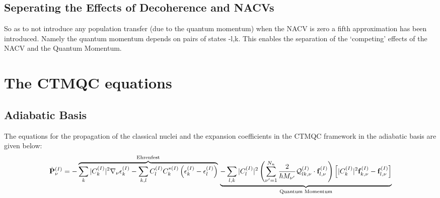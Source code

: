 \subsection{Seperating the Effects of Decoherence and NACVs}
So as to not introduce any population transfer (due to the quantum momentum) when the NACV is zero a fifth approximation has been introduced. Namely the quantum momentum depends on pairs of states -l,k. This enables the separation of the `competing' effects of the NACV and the Quantum Momentum.
\section{The CTMQC equations}
\subsection{Adiabatic Basis}
\label{sec:ad_eqns}
The equations for the propagation of the classical nuclei and the expansion coefficients in the CTMQC framework in the adiabatic basis are given below:
\begin{dmath}
  \dot{\mathbf{P}}_{\nu}^{(I)} =
  -\overbrace{
     \sum_{k} |C_{k}^{(I)}|^2 \nabla_{\nu}\epsilon_{k}^{(I)}
     - \sum_{k,l} C_{l}^{(I)} C_{k}^{* (I)} \left(\epsilon_{k}^{(I)}  - \epsilon_{l}^{(I)}   \right)
  }^{\text{Ehrenfest}}
  \\
  \underbrace{
    - \sum_{l,k} |C_{l}^{(I)}|^2 \left( \sum_{\nu'=1}^{N_n}    \frac{2}{\hbar M_{\nu'}} \mathcal{Q}_{lk, \nu}^{(I)} \cdot    \mathbf{f}_{l, \nu}^{(I)} \right)\left[ |C_{k}^{(I)}|^2    \mathbf{f}_{k,\nu}^{(I)} - \mathbf{f}_{l,\nu}^{(I)} \right]
  }_{\text{Quantum Momentum}}
    \label{eq:nuc_adiab}
\end{dmath}

